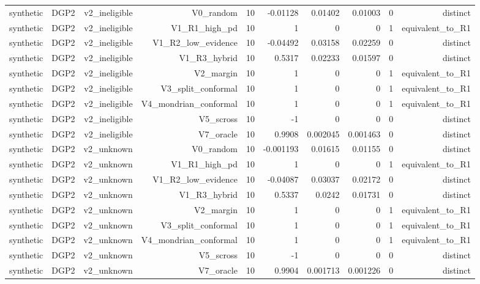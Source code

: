 \begin{table}[htbp]
\begin{tabular}{lrrrrrrrrr}
    synthetic & DGP2 & v2\_ineligible & V0\_random & 10 & -0.01128 & 0.01402 & 0.01003 & 0 & distinct \\
    synthetic & DGP2 & v2\_ineligible & V1\_R1\_high\_pd & 10 & 1 & 0 & 0 & 1 & equivalent\_to\_R1 \\
    synthetic & DGP2 & v2\_ineligible & V1\_R2\_low\_evidence & 10 & -0.04492 & 0.03158 & 0.02259 & 0 & distinct \\
    synthetic & DGP2 & v2\_ineligible & V1\_R3\_hybrid & 10 & 0.5317 & 0.02233 & 0.01597 & 0 & distinct \\
    synthetic & DGP2 & v2\_ineligible & V2\_margin & 10 & 1 & 0 & 0 & 1 & equivalent\_to\_R1 \\
    synthetic & DGP2 & v2\_ineligible & V3\_split\_conformal & 10 & 1 & 0 & 0 & 1 & equivalent\_to\_R1 \\
    synthetic & DGP2 & v2\_ineligible & V4\_mondrian\_conformal & 10 & 1 & 0 & 0 & 1 & equivalent\_to\_R1 \\
    synthetic & DGP2 & v2\_ineligible & V5\_scross & 10 & -1 & 0 & 0 & 0 & distinct \\
    synthetic & DGP2 & v2\_ineligible & V7\_oracle & 10 & 0.9908 & 0.002045 & 0.001463 & 0 & distinct \\
    synthetic & DGP2 & v2\_unknown & V0\_random & 10 & -0.001193 & 0.01615 & 0.01155 & 0 & distinct \\
    synthetic & DGP2 & v2\_unknown & V1\_R1\_high\_pd & 10 & 1 & 0 & 0 & 1 & equivalent\_to\_R1 \\
    synthetic & DGP2 & v2\_unknown & V1\_R2\_low\_evidence & 10 & -0.04087 & 0.03037 & 0.02172 & 0 & distinct \\
    synthetic & DGP2 & v2\_unknown & V1\_R3\_hybrid & 10 & 0.5337 & 0.0242 & 0.01731 & 0 & distinct \\
    synthetic & DGP2 & v2\_unknown & V2\_margin & 10 & 1 & 0 & 0 & 1 & equivalent\_to\_R1 \\
    synthetic & DGP2 & v2\_unknown & V3\_split\_conformal & 10 & 1 & 0 & 0 & 1 & equivalent\_to\_R1 \\
    synthetic & DGP2 & v2\_unknown & V4\_mondrian\_conformal & 10 & 1 & 0 & 0 & 1 & equivalent\_to\_R1 \\
    synthetic & DGP2 & v2\_unknown & V5\_scross & 10 & -1 & 0 & 0 & 0 & distinct \\
    synthetic & DGP2 & v2\_unknown & V7\_oracle & 10 & 0.9904 & 0.001713 & 0.001226 & 0 & distinct \\
    \bottomrule
  \end{tabular}
\end{table}
